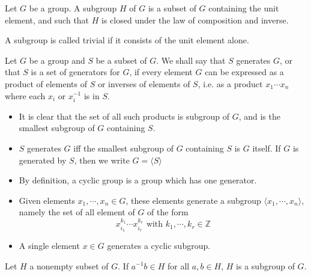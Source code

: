 \begin{definition}[Subgroup]
    Let $G$ be a group. A subgroup $H$ of $G$ is a subset of $G$ containing the unit element, and such that $H$ is closed under the law of composition and inverse.
\end{definition}
\begin{remark}
    A subgroup is called trivial if it consists of the unit element alone.
\end{remark}

\begin{definition}[Generator]
    Let $G$ be a group and $S$ be a subset of $G$. We shall say that $S$ generates $G$, or that $S$ is a set of generators for $G$, if every element $G$ can be expressed as a product of elements of $S$ or inverses of elements of $S$, i.e. as a product $x_1\cdots x_n$ where each $ x_i $ or $ x_i^{-1}$ is in $S$. 
\end{definition}
\begin{remark}
    \begin{itemize}
        \item It is clear that the set of all such products is subgroup of $G$, and is the smallest subgroup of $G$ containing $S$.
        \item $S$ generates $G$ iff the smallest subgroup of $G$ containing $S$ is $G$ itself. If $G$ is generated by $S$, then we write $G=\langle S\rangle$
        \item By definition, a cyclic group is a group which has one generator.
        \item Given elements $x_1,\cdots, x_n\in G$, these elements generate a subgroup $\langle x_1,\cdots , x_n\rangle$, namely the set of all element of $G$ of the form $$x_{i_1}^{k_1}\cdots x_{i_r}^{k_r}\text{  with  } k_1,\cdots, k_r\in \mathbb{Z}$$
        \item A single element $x\in G$ generates a cyclic subgroup.
    \end{itemize}
\end{remark}

\begin{lemma}
    Let $H$ a nonempty subset of $G$. If $a^{-1}b\in H $ for all $a,b\in H$, $H$ is a subgroup of $G$.
\end{lemma}

